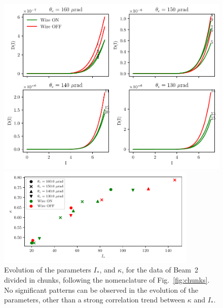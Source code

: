 \begin{figure}[p]
    \centering
    \includegraphics[width=.85\textwidth]{5_wire_compensators_LHC/figs/fokker_planck_b2_2.pdf}
    \caption{Reconstructed $D(I)$ for the data of Beam~2 divided in chunks, following the nomenclature of Fig.~\ref{fig:chunks}. It can be seen how the reconstructed $D(I)$ is consistently different when the wires are switched on and off, with, in general higher diffusion values when the wires are off. The only exception is given by chunk 6, with a crossing angle of $\theta_c=$\SI{150}{\micro\radian}.}
    \label{fig:reconstruction_5}
    \vspace{\floatsep}
    \includegraphics[width=0.85\textwidth]{5_wire_compensators_LHC/figs/fokker_planck_b2.pdf}
    \caption{Evolution of the parameters $I_\ast$, and $\kappa$, for the data of Beam~2 divided in chunks, following the nomenclature of Fig.~\ref{fig:chunks}. No significant patterns can be observed in the evolution of the parameters, other than a strong correlation trend between $\kappa$ and $I_\ast$.}
    \label{fig:parameters_3}
\end{figure}

